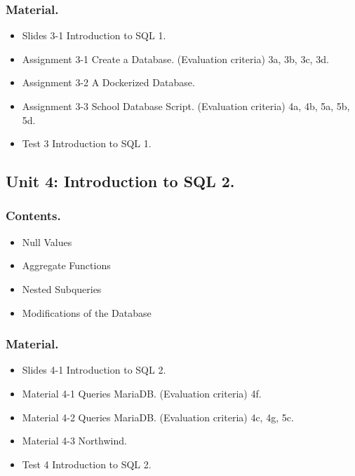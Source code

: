 \documentclass[catalan, a4paper, 12pt, titlepage]{article}
\begin{document}
  \subsubsection{Material.}

  \begin{itemize}
	  \item Slides 3-1 Introduction to SQL 1.
	  \item Assignment 3-1 Create a Database. (\faGraduationCap Evaluation criteria) 3a, 3b, 3c, 3d.
	  \item Assignment 3-2 A Dockerized Database.
	  \item Assignment 3-3 School Database Script. (\faGraduationCap Evaluation criteria) 4a, 4b, 5a, 5b, 5d.
	  \item Test 3 Introduction to SQL 1.
  \end{itemize}

  \subsection{Unit 4: Introduction to SQL 2.}

  \subsubsection{Contents.}
  \begin{itemize}
	  \item Null Values
	  \item Aggregate Functions 
	  \item Nested Subqueries
	  \item Modifications of the Database
  \end{itemize}
  
  \subsubsection{Material.}

  \begin{itemize}
	  \item Slides 4-1 Introduction to SQL 2.
	  \item Material 4-1 Queries MariaDB. (\faGraduationCap Evaluation criteria) 4f.
	  \item Material 4-2 Queries MariaDB. (\faGraduationCap Evaluation criteria) 4c, 4g, 5c.
	  \item Material 4-3 Northwind.
	  \item Test 4 Introduction to SQL 2.
  \end{itemize}
\end{document}
